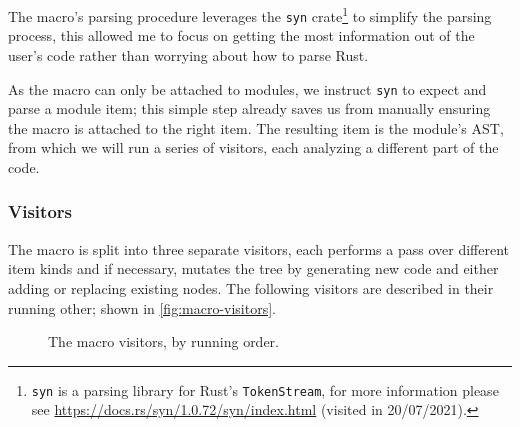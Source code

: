 The macro's parsing procedure leverages the \texttt{syn} crate\footnote{\texttt{syn} is a parsing library for Rust's \texttt{TokenStream},
    for more information please see \url{https://docs.rs/syn/1.0.72/syn/index.html} (visited in 20/07/2021).} to simplify the parsing process,
this allowed me to focus on getting the most information out of the user's code rather than worrying about how to parse Rust.

As the \textcolor{attrgreen}{} macro can only be attached to modules,
we instruct \texttt{syn} to expect and parse a module item;
this simple step already saves us from manually ensuring the macro is attached to the right item.
The resulting item is the module's \gls{AST}, from which we will run a series of visitors,
each analyzing a different part of the code. %

\subsubsection{Visitors}\label{sec:macro-dsl:architecture:visitors}

The macro is split into three separate visitors, each performs a pass over different item kinds and if necessary,
mutates the tree by generating new code and either adding or replacing existing nodes.
The following visitors are described in their running other; shown in \autoref{fig:macro-visitors}.

\begin{figure}
    \centering
    \caption{The \textcolor{attrgreen}{} macro visitors, by running order.}
    \label{fig:macro-visitors}
\end{figure}

